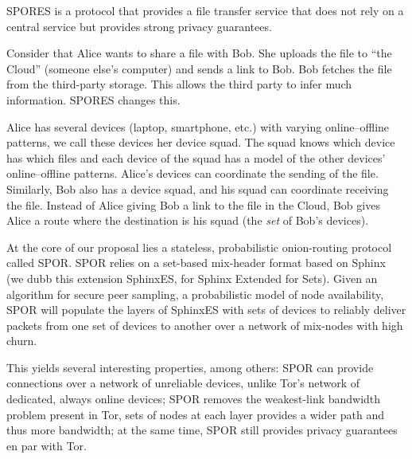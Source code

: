 SPORES is a protocol that provides a file transfer service that does not rely 
on a central service but provides strong privacy guarantees.

Consider that Alice wants to share a file with Bob.
She uploads the file to \enquote{the Cloud} (someone else's computer) and sends 
a link to Bob.
Bob fetches the file from the third-party storage.
This allows the third party to infer much information.
SPORES changes this.

Alice has several devices (laptop, smartphone, etc.) with varying 
online--offline patterns, we call these devices her device squad.
The squad knows which device has which files and each device of the squad has a 
model of the other devices' online--offline patterns.
Alice's devices can coordinate the sending of the file.
Similarly, Bob also has a device squad, and his squad can coordinate receiving 
the file.
Instead of Alice giving Bob a link to the file in the Cloud, Bob gives Alice a 
route where the destination is his squad (\ie the \emph{set} of Bob's devices).

At the core of our proposal lies a stateless, probabilistic onion-routing 
protocol called SPOR\@.
SPOR relies on a set-based mix-header format based on Sphinx~\cite{Sphinx} (we 
dubb this extension SphinxES, for Sphinx Extended for Sets).
Given an algorithm for secure peer sampling, a probabilistic model of node 
availability, SPOR will populate the layers of SphinxES with sets of devices to 
reliably deliver packets from one set of devices to another over a network of 
mix-nodes with high churn.

This yields several interesting properties, among others: SPOR can provide 
connections over a network of unreliable devices, unlike Tor's network of 
dedicated, always online devices; SPOR removes the weakest-link bandwidth 
problem present in Tor, sets of nodes at each layer provides a wider path and 
thus more bandwidth; at the same time, SPOR still provides privacy guarantees 
en par with Tor.

